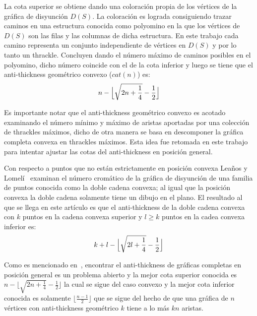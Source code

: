La cota superior se obtiene dando una coloración propia de los vértices de la gráfica
de disyunción $D(S)$. La coloración es lograda consiguiendo trazar caminos en una
estructura conocida como polyomino en la que los vértices de $D(S)$ son las filas
y las columnas de dicha estructura. En este trabajo cada camino representa un
conjunto independiente de vértices en $D(S)$ y por lo tanto un thrackle. Concluyen
dando el número máximo de caminos posibles en el polyomino, dicho número coincide con
el de la cota inferior y luego se tiene que el anti-thickness geométrico convexo ($cat(n)$) es:
\[ n - \Bigl\lfloor \sqrt{2n + \frac{1}{4}} - \frac{1}{2} \Bigr\rfloor \]

Es importante notar que el anti-thickness geométrico convexo es acotado examinando el número mínimo
y máximo de aristas aportadas por una colección de thrackles máximos, dicho de
otra manera se basa en descomponer la gráfica completa convexa en thrackles máximos.
Esta idea fue retomada en este trabajo para intentar ajustar las cotas del anti-thickness
en posición general.

Con respecto a puntos que no están estrictamente en posición convexa Leaños y Lomelí~\cite{Lomeli2018}
examinan el número cromático de la gráfica de disyunción de una familia de puntos
conocida como la doble cadena convexa; al igual que la posición convexa la doble cadena
solamente tiene un dibujo en el plano. El resultado al que se llega en este artículo es que
el anti-thickness de la doble cadena convexa con $k$ puntos en la cadena convexa superior
y $l \geq k$ puntos en la cadea convexa inferior es:
 \[k+l-\Bigl\lfloor \sqrt{2l+\frac{1}{4}} - \frac{1}{2} \Bigr\rfloor\]

 Como es mencionado en~\cite{Dujmovic2017}, encontrar el anti-thickness de gráficas
 completas en posición general es un problema abierto y la mejor cota superior
 conocida es $ n - \lfloor \sqrt{2n + \frac{1}{4}} - \frac{1}{2} \rfloor $
la cual se sigue del caso convexo y la mejor cota inferior conocida es solamente
$\lfloor\frac{n-1}{2}\rfloor$ que se sigue del hecho de que una gráfica de $n$ vértices
con anti-thickness geométrico $k$ tiene a lo más $kn$ aristas.
